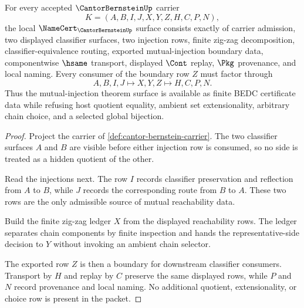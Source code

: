 \begin{theorem}
\label{thm:cantor-bernstein-namecert-obligations}
For every accepted $\CantorBernsteinUp$ carrier
$$
K=(A,B,I,J,X,Y,Z,H,C,P,N),
$$
the local $\NameCert_{\CantorBernsteinUp}$ surface consists exactly of carrier admission, two displayed classifier surfaces, two injection rows, finite zig-zag decomposition, classifier-equivalence routing, exported mutual-injection boundary data, componentwise $\hsame$ transport, displayed $\Cont$ replay, $\Pkg$ provenance, and local naming. Every consumer of the boundary row $Z$ must factor through
$$
A,B,I,J \longmapsto X,Y,Z \longmapsto H,C,P,N.
$$
Thus the mutual-injection theorem surface is available as finite BEDC certificate data while refusing host quotient equality, ambient set extensionality, arbitrary chain choice, and a selected global bijection.
\end{theorem}
\begin{proof}
Project the carrier of \autoref{def:cantor-bernstein-carrier}. The two classifier surfaces $A$ and $B$ are visible before either injection row is consumed, so no side is treated as a hidden quotient of the other.

Read the injections next. The row $I$ records classifier preservation and reflection from $A$ to $B$, while $J$ records the corresponding route from $B$ to $A$. These two rows are the only admissible source of mutual reachability data.

Build the finite zig-zag ledger $X$ from the displayed reachability rows. The ledger separates chain components by finite inspection and hands the representative-side decision to $Y$ without invoking an ambient chain selector.

The exported row $Z$ is then a boundary for downstream classifier consumers. Transport by $H$ and replay by $C$ preserve the same displayed rows, while $P$ and $N$ record provenance and local naming. No additional quotient, extensionality, or choice row is present in the packet.
\end{proof}



